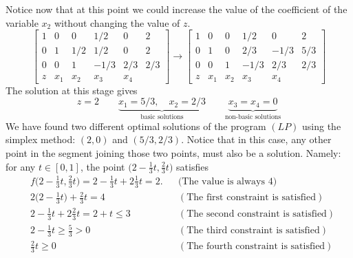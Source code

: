 \begin{example}
\begin{equation*}
\end{equation*}
Notice now that at this point we could increase the value of the coefficient of the variable $x_2$ without changing the value of $z$.
\begin{equation*}
\begin{bmatrix} 
1 & 0   & 0    & 1/2  & 0   & 2 \\
0 & 1   & 1/2  & 1/2  & 0   & 2 \\
0 & 0   & 1    & -1/3 & 2/3 & 2/3 \\ \hline
z & x_1 & x_2  & x_3  & x_4
\end{bmatrix} \to 
\begin{bmatrix} 
1 & 0   & 0    & 1/2  & 0    & 2 \\
0 & 1   & 0    & 2/3  & -1/3 & 5/3 \\
0 & 0   & 1    & -1/3 & 2/3  & 2/3 \\ \hline
z & x_1 & x_2  & x_3  & x_4
\end{bmatrix}
\end{equation*}
The solution at this stage gives
\begin{equation*}
z=2 \qquad \underbrace{x_1=5/3, \quad x_2=2/3}_{\text{basic solutions}} \qquad \underbrace{x_3=x_4=0}_{\text{non-basic solutions}}
\end{equation*}
We have found two different optimal solutions of the program $(LP)$ using the simplex method: $(2,0)$ and $(5/3, 2/3)$.  Notice that in this case, any other point in the segment joining those two points, must also be a solution.  Namely: for any $t \in [0,1]$, the point $\big(2-\tfrac{1}{3}t, \tfrac{2}{3}t \big)$ satisfies
\begin{align*}
&f\big(2-\tfrac{1}{3}t, \tfrac{2}{3}t \big) = 2 - \tfrac{1}{3}t + 2\tfrac{1}{3}t = 2. &&\text{(The value is always 4)} \\
&2\big( 2-\tfrac{1}{3}t \big) + \tfrac{2}{3}t = 4 &&(\text{The first constraint is satisfied}) \\
&2-\tfrac{1}{3}t + 2 \tfrac{2}{3}t = 2 + t \leq 3 &&(\text{The second constraint is satisfied}) \\
&2 - \tfrac{1}{3}t \geq \tfrac{5}{3} > 0 &&(\text{The third constraint is satisfied}) \\
&\tfrac{2}{3}t \geq 0 &&  (\text{The fourth constraint is satisfied})
\end{align*}
\end{example}


